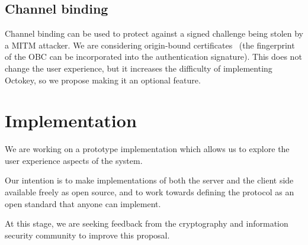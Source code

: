 \documentclass{article}
\begin{document}
\subsection{Channel binding}

Channel binding can be used to protect against a signed challenge being stolen by a MITM attacker.
We are considering origin-bound certificates~\cite{Dietz12} (the fingerprint of the OBC can be
incorporated into the authentication signature). This does not change the user experience, but it
increases the difficulty of implementing Octokey, so we propose making it an optional feature.

\section{Implementation}

We are working on a prototype implementation which allows us to explore the user experience aspects
of the system.

Our intention is to make implementations of both the server and the client side available freely as
open source, and to work towards defining the protocol as an open standard that anyone can
implement.

At this stage, we are seeking feedback from the cryptography and information security community to
improve this proposal.

{}

\end{document}
